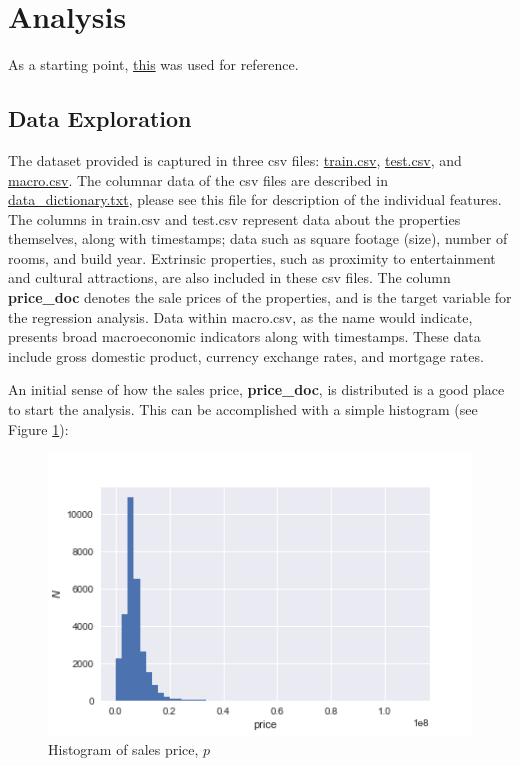 \documentclass[12pt]{article}
\theoremstyle{plain} %
\theoremstyle{definition} %
\theoremstyle{remark} %
\begin{document}
\section{Analysis}

\indent \par As a starting point, \href{https://www.kaggle.com/captcalculator/a-very-extensive-sberbank-exploratory-analysis}{this} was used for reference.

\subsection*{Data Exploration}
\indent \par The dataset provided is captured in three csv files: \href{./data/train.csv}{train.csv}, \href{./data/test.csv}{test.csv}, and \href{./data/macro.csv}{macro.csv}.  
The columnar data of the csv files are described in \href{./data/data_dictionary.txt}{data\_dictionary.txt}, please see this file for description of the individual features.  The columns in train.csv and test.csv represent data about the properties themselves, along with timestamps; data such as square footage (size), number of rooms, and build year.  Extrinsic properties, such as proximity to entertainment and cultural attractions, are also included in these csv files.  The column \textbf{price\_doc} denotes the sale prices of the properties, and is the target variable for the regression analysis.  Data within macro.csv, as the name would indicate, presents broad macroeconomic indicators along with timestamps.  These data include gross domestic product, currency exchange rates, and mortgage rates.

An initial sense of how the sales price, \textbf{price\_doc}, is distributed is a good place to start the analysis.  This can be accomplished with a simple histogram (see Figure \ref{fig:one}):
\begin{figure}[h!]
\begin{center}
\includegraphics[width=12cm]{./output_images/price_doc_hist.png}
\caption{Histogram of sales price, $p$}
\label{fig:one}
\end{center}
\end{figure}
\end{document}
